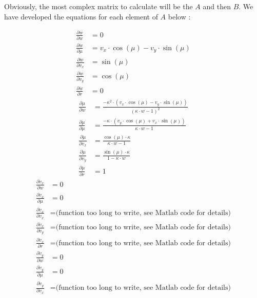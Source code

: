 \documentclass[a4paper, 11pt]{article}
\begin{document}
Obviously, the most complex matrix to calculate will be the $A$ and then $B$. We have developed the equations for each element of $A$ below :
\begin{adjustwidth}{1cm}{}
	\begin{align*}
		\frac{\partial \dot{w}}{\partial w} &= 0\\
		\frac{\partial \dot{w}}{\partial \mu} &= v_x \cdot\cos\left(\mu \right) - v_y \cdot\sin\left(\mu \right) \\
		\frac{\partial \dot{w}}{\partial v_x} &= \sin\left(\mu \right) \\
		\frac{\partial \dot{w}}{\partial v_y} &= \cos\left(\mu \right) \\
		\frac{\partial \dot{w}}{\partial r} &= 0
	\end{align*}
	\begin{align*}
		\frac{\partial \dot{\mu}}{\partial w} &= \frac{-\kappa^2\cdot (v_x\cdot \cos(\mu) - v_y\cdot \sin(\mu))}{(\kappa\cdot w - 1)^2} \\
		\frac{\partial \dot{\mu}}{\partial \mu} &= \frac{-\kappa\cdot(v_y\cdot \cos(\mu) + v_x\cdot \sin(\mu))}{\kappa\cdot w - 1} \\
		\frac{\partial \dot{\mu}}{\partial v_x} &= \frac{\cos(\mu)\cdot \kappa}{\kappa\cdot w - 1} \\
		\frac{\partial \dot{\mu}}{\partial v_y} &= \frac{\sin(\mu)\cdot \kappa}{1-\kappa\cdot w} \\
		\frac{\partial \dot{\mu}}{\partial r} &= 1
	\end{align*}
	\begin{align*}
		\frac{\partial \dot{v}_x}{\partial w} &= 0\\
		\frac{\partial \dot{v}_x}{\partial \mu} &= 0\\
		\frac{\partial \dot{v}_x}{\partial v_x} &= \text{(function too long to write, see Matlab code for details)}\\
		\frac{\partial \dot{v}_x}{\partial v_y} &= \text{(function too long to write, see Matlab code for details)}\\
		\frac{\partial \dot{v}_x}{\partial r} &= \text{(function too long to write, see Matlab code for details)}
	\end{align*}
	\begin{align*}
		\frac{\partial \dot{v}_y}{\partial w} &= 0\\
		\frac{\partial \dot{v}_y}{\partial \mu} &= 0\\
		\frac{\partial \dot{v}_y}{\partial v_x} &= \text{(function too long to write, see Matlab code for details)}\\

\end{align*}
\end{adjustwidth}
\end{document}
